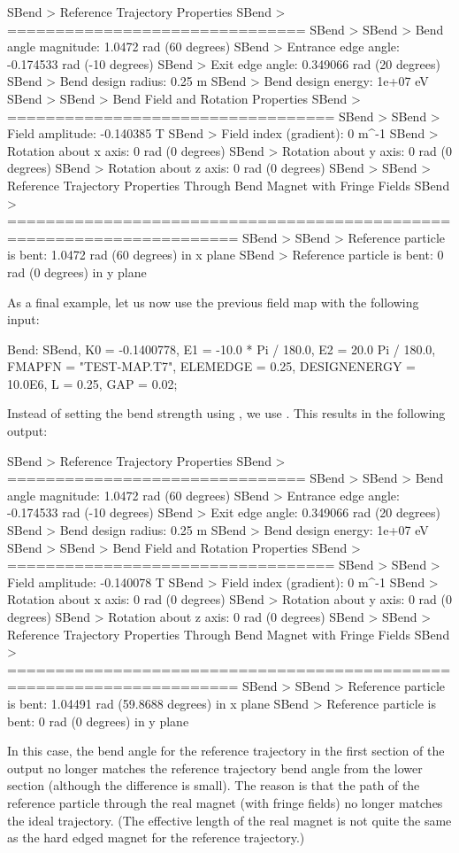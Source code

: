 \begin{example}
SBend > Reference Trajectory Properties
SBend > ===============================
SBend >
SBend > Bend angle magnitude:    1.0472 rad (60 degrees)
SBend > Entrance edge angle:     -0.174533 rad (-10 degrees)
SBend > Exit edge angle:         0.349066 rad (20 degrees)
SBend > Bend design radius:      0.25 m
SBend > Bend design energy:      1e+07 eV
SBend >
SBend > Bend Field and Rotation Properties
SBend > ==================================
SBend >
SBend > Field amplitude:         -0.140385 T
SBend > Field index (gradient):  0 m^-1
SBend > Rotation about x axis:   0 rad (0 degrees)
SBend > Rotation about y axis:   0 rad (0 degrees)
SBend > Rotation about z axis:   0 rad (0 degrees)
SBend >
SBend > Reference Trajectory Properties Through Bend Magnet with Fringe Fields
SBend > ======================================================================
SBend >
SBend > Reference particle is bent: 1.0472 rad (60 degrees) in x plane
SBend > Reference particle is bent: 0 rad (0 degrees) in y plane
\end{example}

As a final example, let us now use the previous field map with the following input:

\begin{example}
Bend: SBend, K0 = -0.1400778,
             E1 = -10.0 * Pi / 180.0,
             E2 = 20.0  Pi / 180.0,
	     FMAPFN = "TEST-MAP.T7",
	     ELEMEDGE = 0.25,
	     DESIGNENERGY = 10.0E6,
             L = 0.25,
	     GAP = 0.02;
\end{example}
Instead of setting the bend strength using , we use . This results in the following output:

\begin{example}
SBend > Reference Trajectory Properties
SBend > ===============================
SBend >
SBend > Bend angle magnitude:    1.0472 rad (60 degrees)
SBend > Entrance edge angle:     -0.174533 rad (-10 degrees)
SBend > Exit edge angle:         0.349066 rad (20 degrees)
SBend > Bend design radius:      0.25 m
SBend > Bend design energy:      1e+07 eV
SBend >
SBend > Bend Field and Rotation Properties
SBend > ==================================
SBend >
SBend > Field amplitude:         -0.140078 T
SBend > Field index (gradient):  0 m^-1
SBend > Rotation about x axis:   0 rad (0 degrees)
SBend > Rotation about y axis:   0 rad (0 degrees)
SBend > Rotation about z axis:   0 rad (0 degrees)
SBend >
SBend > Reference Trajectory Properties Through Bend Magnet with Fringe Fields
SBend > ======================================================================
SBend >
SBend > Reference particle is bent: 1.04491 rad (59.8688 degrees) in x plane
SBend > Reference particle is bent: 0 rad (0 degrees) in y plane
\end{example}
In this case, the bend angle for the reference trajectory in the first section of the output
no longer matches the reference trajectory bend angle from the lower section (although the difference is small).
The reason is that the path of the reference particle through the real magnet (with fringe fields) no longer
matches the ideal trajectory. (The effective length of the real magnet is not quite the same as the hard
edged magnet for the reference trajectory.)

